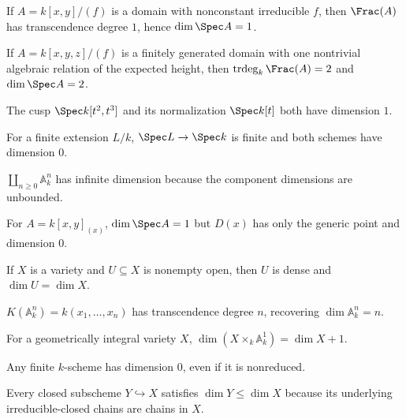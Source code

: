 \begin{example}\label{ex:vi30-10}
If $A=k[x,y]/(f)$ is a domain with nonconstant irreducible $f$, then $\Frac(A)$ has transcendence degree $1$, hence $\dim\Spec A=1$.
\end{example}

\begin{example}\label{ex:vi30-11}
If $A=k[x,y,z]/(f)$ is a finitely generated domain with one nontrivial algebraic relation of the expected height, then $\operatorname{trdeg}_k\Frac(A)=2$ and $\dim\Spec A=2$.
\end{example}

\begin{example}[Normalization]\label{ex:vi30-12}
The cusp $\Spec k[t^2,t^3]$ and its normalization $\Spec k[t]$ both have dimension $1$.
\end{example}

\begin{example}\label{ex:vi30-13}
For a finite extension $L/k$, $\Spec L\to\Spec k$ is finite and both schemes have dimension $0$.
\end{example}

\begin{example}\label{ex:vi30-14}
$\coprod_{n\ge0}\mathbb A^n_k$ has infinite dimension because the component dimensions are unbounded.
\end{example}

\begin{example}\label{ex:vi30-15}
For $A=k[x,y]_{(x)}$, $\dim\Spec A=1$ but $D(x)$ has only the generic point and dimension $0$.
\end{example}

\begin{example}\label{ex:vi30-16}
If $X$ is a variety and $U\subseteq X$ is nonempty open, then $U$ is dense and $\dim U=\dim X$.
\end{example}

\begin{example}\label{ex:vi30-17}
$K(\mathbb A^n_k)=k(x_1,\ldots,x_n)$ has transcendence degree $n$, recovering $\dim\mathbb A^n_k=n$.
\end{example}

\begin{example}\label{ex:vi30-18}
For a geometrically integral variety $X$, $\dim(X\times_k\mathbb A^1_k)=\dim X+1$.
\end{example}

\begin{example}\label{ex:vi30-19}
Any finite $k$-scheme has dimension $0$, even if it is nonreduced.
\end{example}

\begin{example}\label{ex:vi30-20}
Every closed subscheme $Y\hookrightarrow X$ satisfies $\dim Y\le\dim X$ because its underlying irreducible-closed chains are chains in $X$.
\end{example}